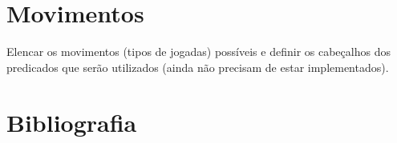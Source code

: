 \documentclass[a4paper]{article}
\begin{document}
\section{Movimentos}

Elencar os movimentos (tipos de jogadas) possíveis e definir os cabeçalhos dos predicados que serão utilizados (ainda não precisam de estar implementados).

\section*{Bibliografia}

\end{document}
